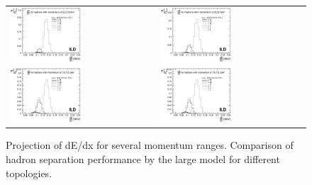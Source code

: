 \documentclass[preprint]{elsarticle}
\begin{document}
\begin{itemize}
\begin{figure}[h!]
\centering
\begin{tabular}{ll}
  \includegraphics[width=0.5\textwidth]{figures_Methods/separation_had_2GeV_bbbar_vs_ttbar_v2.eps} & 
  \includegraphics[width=0.5\textwidth]{figures_Methods/separation_had_5GeV_bbbar_vs_ttbar_v2.eps} \\ 
  \includegraphics[width=0.5\textwidth]{figures_Methods/separation_had_10GeV_bbbar_vs_ttbar_v2.eps} & 
  \includegraphics[width=0.5\textwidth]{figures_Methods/separation_had_10GeV_bbbar_vs_ttbar_v2.eps} 	
\end{tabular}
\caption{Projection of dE/dx for several momentum ranges. Comparison of hadron separation performance by the large model for different topologies. }
\label{fig_dEdx_2}
\end{figure}


\end{itemize}
\end{document}
